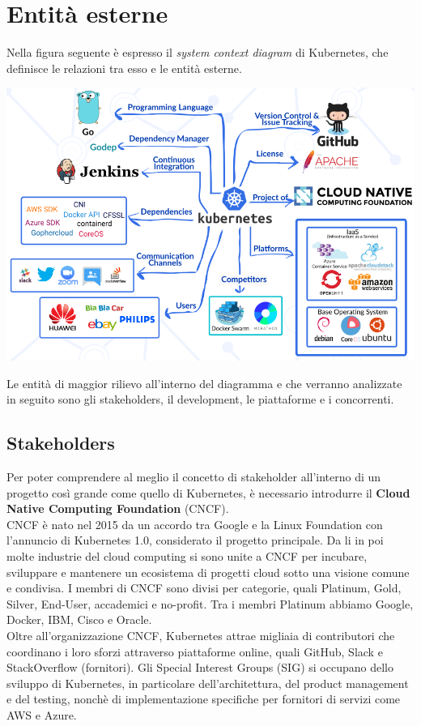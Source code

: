\documentclass[12pt, a4paper]{report}
\begin{document}
\section{Entità esterne}
Nella figura seguente è espresso il \textit{system context diagram} di Kubernetes, che definisce le relazioni tra esso e le entità esterne.
\begin{center}
  \includegraphics[scale = 0.6]{Images/ContextModelDiagram}
\end{center}
Le entità di maggior rilievo all'interno del diagramma e che verranno analizzate in seguito sono gli stakeholders, il development, le piattaforme e i concorrenti.
\subsection{Stakeholders}
Per poter comprendere al meglio il concetto di stakeholder all'interno di un progetto così grande come quello di Kubernetes, è necessario introdurre il \textbf{Cloud Native Computing Foundation} (CNCF).\\
CNCF è nato nel 2015 da un accordo tra Google e la Linux Foundation con l'annuncio di Kubernetes 1.0, considerato il progetto principale. Da li in poi molte industrie del cloud computing si sono unite a CNCF per incubare, sviluppare e mantenere un ecosistema di progetti cloud sotto una visione comune e condivisa. I membri di CNCF sono divisi per categorie, quali Platinum, Gold, Silver, End-User, accademici e no-profit. Tra i membri Platinum abbiamo Google, Docker, IBM, Cisco e Oracle.\\
Oltre all'organizzazione CNCF, Kubernetes attrae migliaia di contributori che coordinano i loro sforzi attraverso piattaforme online, quali GitHub, Slack e StackOverflow (fornitori). Gli Special Interest Groups (SIG) si occupano dello sviluppo di Kubernetes, in particolare dell'architettura, del product management e del testing, nonchè di implementazione specifiche per fornitori di servizi come AWS e Azure.
\end{document}
